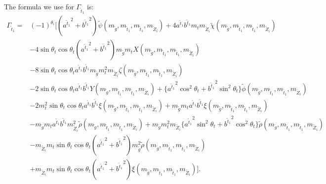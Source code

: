 \documentclass[final,3p,times]{elsarticle}
\begin{document}
The formula we use for $\Gamma_{\tilde{t}_1}$ is:
\begin{equation}
\begin{aligned}
\Gamma_{\tilde{t}_1} = & (-1)^{\theta_i}\Big[({a^{\tilde{t}_1}}^2 + {b^{\tilde{t}_1}}^2)\tilde{\psi} (m_{\tilde{g}},m_{\tilde{t}_1}, m_{\tilde{t}_1}, m_{\tilde{Z}_i}) + 4 a^{\tilde{t}_1} b^{\tilde{t}_1}m_{t}m_{\tilde{Z}_i}\tilde{\chi} (m_{\tilde{g}},m_{\tilde{t}_1}, m_{\tilde{t}_1}, m_{\tilde{Z}_i}) \\ & - 4 \sin\theta_t \cos\theta_t({a^{\tilde{t}_1}}^2 + {b^{\tilde{t}_1}}^2) m_{\tilde{g}} m_{t} X(m_{\tilde{g}},m_{\tilde{t}_1}, m_{\tilde{t}_1}, m_{\tilde{Z}_i}) \\ &  -8 \sin\theta_t \cos\theta_t a^{\tilde{t}_1} b^{\tilde{t}_1} m_{\tilde{g}} m_{t}^{2} m_{\tilde{Z}_i}\zeta (m_{\tilde{g}},m_{\tilde{t}_1}, m_{\tilde{t}_1}, m_{\tilde{Z}_i}) \\ & -2\sin\theta_t \cos\theta_t a^{\tilde{t}_1} b^{\tilde{t}_1} Y(m_{\tilde{g}},m_{\tilde{t}_1}, m_{\tilde{t}_1}, m_{\tilde{Z}_i}) + \{{a^{\tilde{t}_1}}^2 \cos^2 \theta_t + {b^{\tilde{t}_1}}^2 \sin^2 \theta_t\}\tilde{\phi} (m_{\tilde{g}},m_{\tilde{t}_1}, m_{\tilde{t}_1}, m_{\tilde{Z}_i}) \\ & - 2 m_{t}^2 \sin\theta_t \cos\theta_t a^{\tilde{t}_1} b^{\tilde{t}_1} \xi (m_{\tilde{g}},m_{\tilde{t}_1}, m_{\tilde{t}_1}, m_{\tilde{Z}_i}) + m_{\tilde{g}} m_{t} a^{\tilde{t}_1} b^{\tilde{t}_1} \xi (m_{\tilde{g}},m_{\tilde{t}_1}, m_{\tilde{t}_1}, m_{\tilde{Z}_i}) \\ & - m_{\tilde{g}} m_{t} a^{\tilde{t}_1} b^{\tilde{t}_1}m_{\tilde{Z}_{i}}^2 \tilde{\rho} (m_{\tilde{g}},m_{\tilde{t}_1}, m_{\tilde{t}_1}, m_{\tilde{Z}_i}) + m_{\tilde{g}}m_{t}^2 m_{\tilde{Z}_i}\{{a^{\tilde{t}_1}}^2 \sin^2 \theta_t  + {b^{\tilde{t}_1}}^2 \cos^2 \theta_t \}\tilde{\rho} (m_{\tilde{g}},m_{\tilde{t}_1}, m_{\tilde{t}_1}, m_{\tilde{Z}_i}) \\ & -m_{\tilde{Z}_i} m_{t}\sin\theta_t \cos\theta_t ({a^{\tilde{t}_1}}^2 + {b^{\tilde{t}_1}}^2)m_{\tilde{g}}^2 \tilde{\rho} (m_{\tilde{g}},m_{\tilde{t}_1}, m_{\tilde{t}_1}, m_{\tilde{Z}_i}) \\ & + m_{\tilde{Z}_i} m_{t} \sin\theta_{t} \cos\theta_{t} ({a^{\tilde{t}_1}}^2 + {b^{\tilde{t}_1}}^2) \xi (m_{\tilde{g}},m_{\tilde{t}_1}, m_{\tilde{t}_1}, m_{\tilde{Z}_i})\Big].
\end{aligned}
\end{equation}
\end{document}
